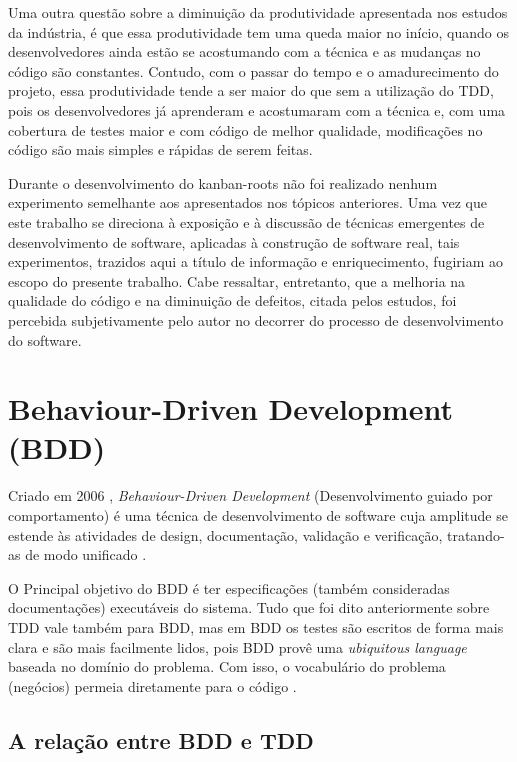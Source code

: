 Uma outra questão sobre a diminuição da produtividade apresentada nos estudos da indústria, é que essa produtividade tem uma queda maior no início, quando os desenvolvedores ainda estão se acostumando com a técnica e as mudanças no código são constantes. Contudo, com o passar do tempo e o amadurecimento do projeto, essa produtividade tende a ser maior do que sem a utilização do TDD, pois os desenvolvedores já aprenderam e acostumaram com a técnica e, com uma cobertura de testes maior e com código de melhor qualidade, modificações no código são mais simples e rápidas de serem feitas.

Durante o desenvolvimento do kanban-roots não foi realizado nenhum experimento semelhante aos apresentados nos tópicos anteriores. Uma vez que este trabalho se direciona à exposição e à discussão de técnicas emergentes de desenvolvimento de software, aplicadas à construção de software real, tais experimentos, trazidos aqui a título de informação e enriquecimento, fugiriam ao escopo do presente trabalho. Cabe ressaltar, entretanto, que a melhoria na qualidade do código e na diminuição de defeitos, citada pelos estudos, foi percebida subjetivamente pelo autor no decorrer do processo de desenvolvimento do software.





\section{Behaviour-Driven Development (BDD)}
\label{sec:bdd}

Criado em 2006 \cite{IntroducingBDD}, \textit{Behaviour-Driven Development} (Desenvolvimento guiado por comportamento) é uma técnica de desenvolvimento de software cuja amplitude se estende às atividades de design, documentação, validação e verificação, tratando-as de modo unificado \cite{BDDRodrigo}.

O Principal objetivo do BDD é ter especificações (também consideradas documentações) executáveis do sistema. Tudo que foi dito anteriormente sobre TDD vale também para BDD, mas em BDD os testes são escritos de forma mais clara e são mais facilmente lidos, pois BDD provê uma \textit{ubiquitous language} baseada no domínio do problema. Com isso, o vocabulário do problema (negócios) permeia diretamente para o código \cite{IntroducingBDD}.

\subsection{A relação entre BDD e TDD}
\label{sub:a_relacao_entre_bdd_e_tdd}

